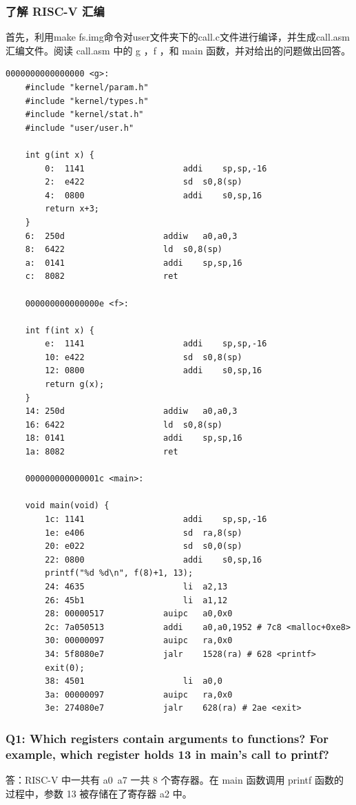 \subsubsection{了解 RISC-V 汇编}
首先，利用make fs.img命令对user文件夹下的call.c文件进行编译，并生成call.asm汇编文件。阅读 call.asm 中的 g ，f ，和 main 函数，并对给出的问题做出回答。
\begin{lstlisting}[language={[x86masm]Assembler}, title=call.asm]
    0000000000000000 <g>:
    #include "kernel/param.h"
    #include "kernel/types.h"
    #include "kernel/stat.h"
    #include "user/user.h"

    int g(int x) {
        0:	1141                	addi	sp,sp,-16
        2:	e422                	sd	s0,8(sp)
        4:	0800                	addi	s0,sp,16
        return x+3;
    }
    6:	250d                	addiw	a0,a0,3
    8:	6422                	ld	s0,8(sp)
    a:	0141                	addi	sp,sp,16
    c:	8082                	ret

    000000000000000e <f>:

    int f(int x) {
        e:	1141                	addi	sp,sp,-16
        10:	e422                	sd	s0,8(sp)
        12:	0800                	addi	s0,sp,16
        return g(x);
    }
    14:	250d                	addiw	a0,a0,3
    16:	6422                	ld	s0,8(sp)
    18:	0141                	addi	sp,sp,16
    1a:	8082                	ret

    000000000000001c <main>:

    void main(void) {
        1c:	1141                	addi	sp,sp,-16
        1e:	e406                	sd	ra,8(sp)
        20:	e022                	sd	s0,0(sp)
        22:	0800                	addi	s0,sp,16
        printf("%d %d\n", f(8)+1, 13);
        24:	4635                	li	a2,13
        26:	45b1                	li	a1,12
        28:	00000517          	auipc	a0,0x0
        2c:	7a050513          	addi	a0,a0,1952 # 7c8 <malloc+0xe8>
        30:	00000097          	auipc	ra,0x0
        34:	5f8080e7          	jalr	1528(ra) # 628 <printf>
        exit(0);
        38:	4501                	li	a0,0
        3a:	00000097          	auipc	ra,0x0
        3e:	274080e7          	jalr	628(ra) # 2ae <exit>
\end{lstlisting}

\subsubsection*{Q1: Which registers contain arguments to functions? For example, which register holds 13 in main's call to printf?}
答：RISC-V 中一共有 a0~a7 一共 8 个寄存器。在 main 函数调用 printf 函数的过程中，参数 13 被存储在了寄存器 a2 中。
